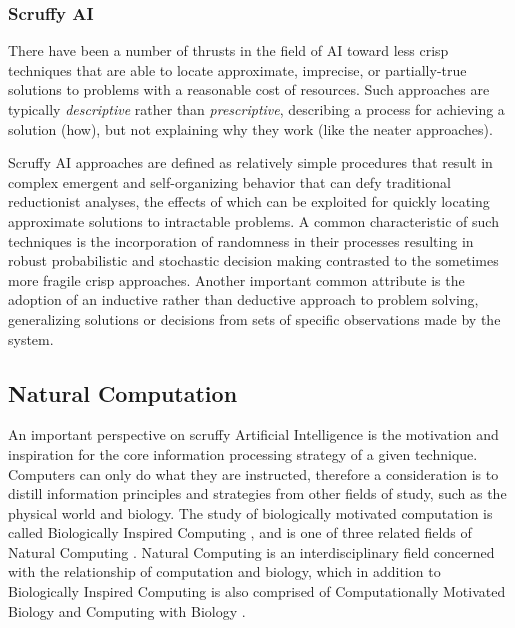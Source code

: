 \subsubsection{Scruffy AI}
There have been a number of thrusts in the field of AI toward less crisp techniques that are able to locate approximate, imprecise, or partially-true solutions to problems with a reasonable cost of resources. Such approaches are typically \emph{descriptive} rather than \emph{prescriptive}, describing a process for achieving a solution (how), but not explaining why they work (like the neater approaches). 

Scruffy AI approaches are defined as relatively simple procedures that result in complex emergent and self-organizing behavior that can defy traditional reductionist analyses, the effects of which can be exploited for quickly locating approximate solutions to intractable problems. A common characteristic of such techniques is the incorporation of randomness in their processes resulting in robust probabilistic and stochastic decision making contrasted to the sometimes more fragile crisp approaches. Another important common attribute is the adoption of an inductive rather than deductive approach to problem solving, generalizing solutions or decisions from sets of specific observations made by the system.

% 
% 
\subsection{Natural Computation}
\label{sec:natural_computation}
An important perspective on scruffy Artificial Intelligence is the motivation and inspiration for the core information processing strategy of a given technique. Computers can only do what they are instructed, therefore a consideration is to distill information principles and strategies from other fields of study, such as the physical world and biology. The study of biologically motivated computation is called Biologically Inspired Computing \cite{Castro2005a}, and is one of three related fields of Natural Computing \cite{Forbes2000, Forbes2005, Paton1994}. 
Natural Computing is an interdisciplinary field concerned with the relationship of computation and biology, which in addition to Biologically Inspired Computing is also comprised of Computationally Motivated Biology and Computing with Biology \cite{Paun2005, Marrow2000}.

